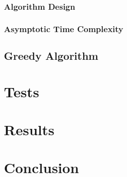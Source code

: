 \documentclass[conference]{IEEEtran}
\begin{document}
\subsubsection{Algorithm Design}

\subsubsection{Asymptotic Time Complexity}

\subsection{Greedy Algorithm}

\section{Tests}

\section{Results}


\section{Conclusion}



\end{document}
